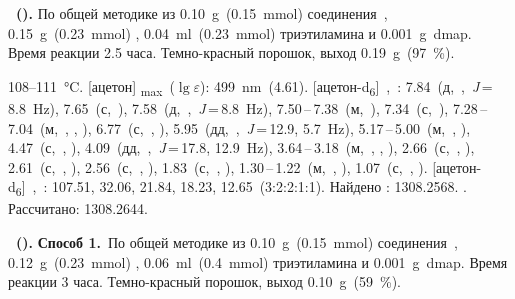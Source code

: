 \textbf{~().} 
По общей методике из \SI{0.10}{\gram}~(\SI{0.15}{\milli\mole}) соединения~, \SI{0.15}{\gram}~(\SI{0.23}{\milli\mole}) , \SI{0.04}{\milli\litre}~(\SI{0.23}{\milli\mole}) триэтиламина и \SI{0.001}{\gram}~\ac{dmap}.
Время реакции 2.5 часа.
Темно-красный порошок, выход \SI{0.19}{\gram}~(\SI{97}{\percent}).
\begin{experimental}
     108--\SI{111}{\celsius}.
    [ацетон] \chemlambda\textsubscript{max}~($\lg \varepsilon$): \SI{499}{\nano\metre}~(4.61).
    [ацетон-d\textsubscript{6}]~\chemdelta,~\si{\ppm}: 7.84~(д,~,~\textit{J}\,=\,8.8~\si{\hertz}), 7.65~(с,~), 7.58~(д,~,~\textit{J}\,=\,8.8~\si{\hertz}), 7.50\,--\,7.38~(м,~), 7.34~(с,~), 7.28\,--\,7.04~(м,~, , ), 6.77~(с,~, ), 5.95~(дд,~,~\textit{J}\,=\,12.9, 5.7~\si{\hertz}), 5.17\,--\,5.00~(м,~, ), 4.47~(с,~, ), 4.09~(дд,~,~\textit{J}\,=\,17.8, 12.9~\si{\hertz}), 3.64\,--\,3.18~(м,~, , ), 2.66~(с,~, ), 2.61~(с,~, ), 2.56~(с,~, ), 1.83~(с,~, ), 1.30\,--\,1.22~(м,~, ), 1.07~(с,~, ).
    [ацетон-d\textsubscript{6}]~\chemdelta,~\si{\ppm}: 107.51, 32.06, 21.84, 18.23, 12.65~(3:2:2:1:1).
     Найдено \ce{[M + H]+}: \num{1308.2568}. . Рассчитано: \ce{[M + H]} \num{1308.2644}.
\end{experimental}


\textbf{~().} 
\textbf{Способ 1.}~По общей методике из \SI{0.10}{\gram}~(\SI{0.15}{\milli\mole}) соединения~, \SI{0.12}{\gram}~(\SI{0.23}{\milli\mole}) , \SI{0.06}{\milli\litre}~(\SI{0.4}{\milli\mole}) триэтиламина и \SI{0.001}{\gram}~\ac{dmap}.
Время реакции 3 часа.
Темно-красный порошок, выход \SI{0.10}{\gram}~(\SI{59}{\percent}).

